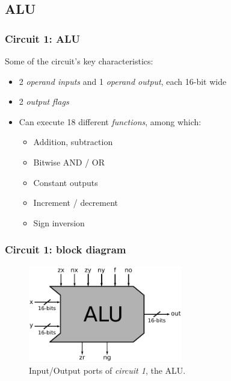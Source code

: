     \subsection{ALU}
    \label{subsec:alu}
        \begin{frame}
            \frametitle{Circuit 1: ALU}

            \par{Some of the circuit's key characteristics:}

            \begin{itemize}
                \item 2 \emph{operand inputs} and 1 \emph{operand output}, each 16-bit wide
                \item 2 \emph{output flags}
                \item Can execute 18 different \emph{functions}, among which:
                    \begin{itemize}
                        \item Addition, subtraction
                        \item Bitwise AND / OR
                        \item Constant outputs
                        \item Increment / decrement
                        \item Sign inversion
                    \end{itemize}
            \end{itemize}

        \end{frame}

        \begin{frame}
            \frametitle{Circuit 1: block diagram}

            \begin{figure}[h!]
                \centerline{\includegraphics[width=0.6\textwidth]{imgs/alu-block.pdf}}
                \caption{Input/Output ports of \emph{circuit 1}, the ALU.
                    \label{fig:alu-block}}
            \end{figure}

        \end{frame}

